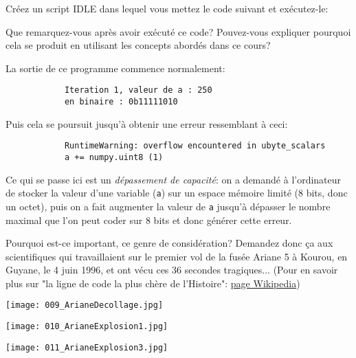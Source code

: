 \documentclass[12pt]{article}
\begin{document}
	\begin{MonExo}
		Créez un script IDLE dans lequel vous mettez le code suivant et exécutez-le:
		

		Que remarquez-vous après avoir exécuté ce code? Pouvez-vous expliquer pourquoi cela se produit en utilisant les concepts abordés dans ce cours?
	\end{MonExo}
	\begin{MaReponse}
		La sortie de ce programme commence normalement:
		\begin{verbatim}
			Iteration 1, valeur de a : 250
			en binaire : 0b11111010
		\end{verbatim}
		Puis cela se poursuit jusqu'à obtenir une erreur ressemblant à ceci:
		\begin{verbatim}
			RuntimeWarning: overflow encountered in ubyte_scalars
			a += numpy.uint8 (1)
		\end{verbatim}
		Ce qui se passe ici est un \emph{dépassement de capacité}: on a demandé à l'ordinateur de stocker la valeur d'une variable (\texttt{a}) sur un espace mémoire limité (8 bits, donc un octet), puis on a fait augmenter la valeur de \texttt{a} jusqu'à dépasser le nombre maximal que l'on peut coder sur 8 bits et donc générer cette erreur.
	\end{MaReponse}
	
	Pourquoi est-ce important, ce genre de considération? Demandez donc ça aux scientifiques qui travaillaient sur le premier vol de la fusée Ariane 5 à Kourou, en Guyane, le 4 juin 1996, et ont vécu ces 36 secondes tragiques... (Pour en savoir plus sur "la ligne de code la plus chère de l'Histoire": 	\href{https://fr.wikipedia.org/wiki/Vol_501_d%27Ariane_5}{page Wikipedia})

	\begin{minipage}{0.24\textwidth}
		\centering
		\texttt{[image: 009\_ArianeDecollage.jpg]} %
	\end{minipage}\hfill
	\begin{minipage}{0.24\textwidth}
		\centering
		\texttt{[image: 010\_ArianeExplosion1.jpg]}
	\end{minipage}
	\begin{minipage}{0.5\textwidth}
		\centering
		\texttt{[image: 011\_ArianeExplosion3.jpg]}
	\end{minipage}
		
\end{document}
